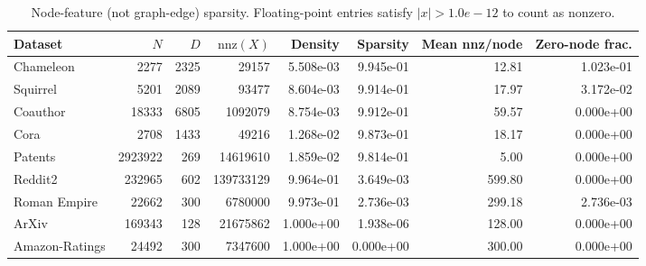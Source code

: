 \begin{table}[t]
\centering
\small
\setlength{\tabcolsep}{3.5pt}
\begin{tabular}{lrrrrrrr}
\toprule
Dataset & $N$ & $D$ & $\mathrm{nnz}(X)$ & Density & Sparsity & Mean nnz/node & Zero-node frac. \\
\midrule
Chameleon & 2277 & 2325 & 29157 & 5.508e-03 & 9.945e-01 & 12.81 & 1.023e-01 \\
Squirrel & 5201 & 2089 & 93477 & 8.604e-03 & 9.914e-01 & 17.97 & 3.172e-02 \\
Coauthor & 18333 & 6805 & 1092079 & 8.754e-03 & 9.912e-01 & 59.57 & 0.000e+00 \\
Cora & 2708 & 1433 & 49216 & 1.268e-02 & 9.873e-01 & 18.17 & 0.000e+00 \\
Patents & 2923922 & 269 & 14619610 & 1.859e-02 & 9.814e-01 & 5.00 & 0.000e+00 \\
Reddit2 & 232965 & 602 & 139733129 & 9.964e-01 & 3.649e-03 & 599.80 & 0.000e+00 \\
Roman Empire & 22662 & 300 & 6780000 & 9.973e-01 & 2.736e-03 & 299.18 & 2.736e-03 \\
ArXiv & 169343 & 128 & 21675862 & 1.000e+00 & 1.938e-06 & 128.00 & 0.000e+00 \\
Amazon-Ratings & 24492 & 300 & 7347600 & 1.000e+00 & 0.000e+00 & 300.00 & 0.000e+00 \\
\bottomrule
\end{tabular}
\caption{Node-feature (not graph-edge) sparsity. Floating-point entries satisfy $|x|>1.0e-12$ to count as nonzero.}
\label{tab:feature-sparsity}
\end{table}
